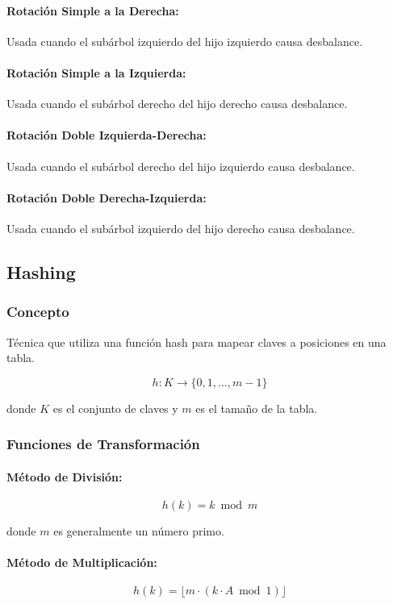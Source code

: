 \documentclass[12pt,a4paper]{article}
\begin{document}
\paragraph{Rotación Simple a la Derecha:}
Usada cuando el subárbol izquierdo del hijo izquierdo causa desbalance.

\paragraph{Rotación Simple a la Izquierda:}
Usada cuando el subárbol derecho del hijo derecho causa desbalance.

\paragraph{Rotación Doble Izquierda-Derecha:}
Usada cuando el subárbol derecho del hijo izquierdo causa desbalance.

\paragraph{Rotación Doble Derecha-Izquierda:}
Usada cuando el subárbol izquierdo del hijo derecho causa desbalance.

\subsection{Hashing}

\subsubsection{Concepto}
Técnica que utiliza una función hash para mapear claves a posiciones en una tabla.

$$h: K \rightarrow \{0, 1, ..., m-1\}$$

donde $K$ es el conjunto de claves y $m$ es el tamaño de la tabla.

\subsubsection{Funciones de Transformación}

\paragraph{Método de División:}
$$h(k) = k \bmod m$$

donde $m$ es generalmente un número primo.

\paragraph{Método de Multiplicación:}
$$h(k) = \lfloor m \cdot (k \cdot A \bmod 1) \rfloor$$
\end{document}
